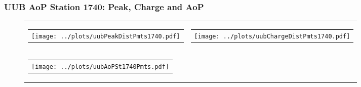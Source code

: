 \documentclass[aspectratio=169]{beamer}
\begin{document}

\begin{frame}
  \frametitle{UUB AoP Station 1740: Peak, Charge and AoP}
  \begin{figure}
    \centering
    \begin{tabularx}{\textwidth}{CC}
      \begin{tabular}{l}
        \texttt{[image: ../plots/uubPeakDistPmts1740.pdf]}
      \end{tabular}
      &
      \begin{tabular}{l}
        \texttt{[image: ../plots/uubChargeDistPmts1740.pdf]}
      \end{tabular}
      \\
      \begin{tabular}{l}
        \texttt{[image: ../plots/uubAoPSt1740Pmts.pdf]}
      \end{tabular}
    \end{tabularx}
  \end{figure}
\end{frame}
\end{document}
